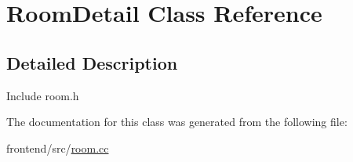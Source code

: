 \hypertarget{classRoomDetail}{\section{Room\-Detail Class Reference}
\label{classRoomDetail}
}


\subsection{Detailed Description}
Include room.\-h 

The documentation for this class was generated from the following file\-:\begin{DoxyCompactItemize}
\item 
frontend/src/\hyperlink{room_8cc}{room.\-cc}\end{DoxyCompactItemize}
